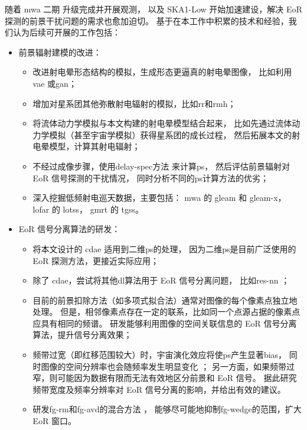 \begin{summary}
随着 \ac{mwa} 二期 \cite{wayth2018} 升级完成并开展观测，
以及 SKA1-Low 开始加速建设，解决 EoR 探测的前景干扰问题的需求也愈加迫切。
基于在本工作中积累的技术和经验，我们认为后续可开展的工作包括：
\begin{itemize}
\item 前景辐射建模的改进：
  \begin{itemize}
    \item 改进射电晕形态结构的模拟，生成形态更逼真的射电晕图像，
      比如利用\ac{vae}\cite{kingma2013} 或\ac{gan}\cite{goodfellow2014}；
    \item 增加对星系团其他弥散射电辐射的模拟，比如\ac{rr}和\ac{rmh}；
    \item 将流体动力学模拟与本文构建的射电晕模型结合起来，
      比如先通过流体动力学模拟（甚至宇宙学模拟）获得星系团的成长过程，
      然后拓展本文的射电晕模型，计算其射电辐射；
    \item 不经过成像步骤，使用\ac{delay-spec}方法\cite{parsons2012}
      来计算\ac{ps}\cite{morales2019}，
      然后评估前景辐射对 EoR 信号探测的干扰情况，
      同时分析不同的\ac{ps}计算方法的优劣；
    \item 深入挖掘低频射电巡天数据，主要包括：
      \ac{mwa} 的 \ac{gleam}\cite{wayth2015,hurleyWalker2017}
      和 \ac{gleam-x}\cite{hurleyWalker2017prop}，
      \ac{lofar} 的 \ac{lotss}\cite{shimwell2017,shimwell2019}，
      \ac{gmrt} 的 \ac{tgss}\cite{intema2017}。
  \end{itemize}

\item EoR 信号分离算法的研发：
  \begin{itemize}
    \item 将本文设计的 \ac{cdae} 适用到二维\ac{ps}的处理，
      因为二维\ac{ps}是目前广泛使用的 EoR 探测方法，更接近实际应用；
    \item 除了 \ac{cdae}，尝试将其他\ac{dl}算法用于 EoR 信号分离问题，
      比如\ac{res-nn} \cite{he2016}；
    \item 目前的前景扣除方法（如多项式拟合法）通常对图像的每个像素点独立地处理。
      但是，相邻像素点存在一定的联系，比如同一个点源占据的像素点应具有相同的频谱。
      研发能够利用图像的空间关联信息的 EoR 信号分离算法，提升信号分离效果；
    \item 频带过宽（即红移范围较大）时，宇宙演化效应将使\ac{ps}产生显著\ac{bias}，
      同时图像的空间分辨率也会随频率发生明显变化 \cite{bowman2009}；
      另一方面，如果频带过窄，则可能因为数据有限而无法有效地区分前景和 EoR 信号。
      据此研究频带宽度及频率分辨率对 EoR 信号分离的影响，并给出有效的建议。
    \item 研发\ac{fg-rm}和\ac{fg-avd}的混合方法 \cite{kerrigan2018}，
      能够尽可能地抑制\ac{fg-wedge}的范围，扩大 EoR 窗口。
  \end{itemize}
\end{itemize}

\end{summary}
